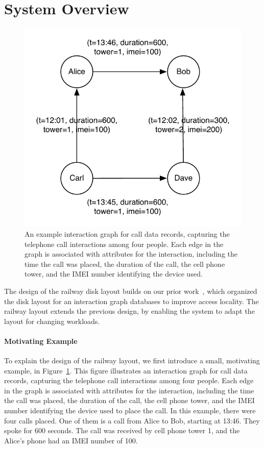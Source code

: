 \section{System Overview}\label{sec:system}


\begin{figure}[t]
\includegraphics[width=0.9\columnwidth]{figures/example_interaction.pdf} 
 \caption{An example interaction graph for call data records, capturing the
   telephone call interactions among four people. Each edge in the graph is
   associated with attributes for the interaction, including the time the call
   was placed, the duration of the call, the cell phone tower, and the IMEI
   number identifying the device used.}
 \label{fig:example}
 \end{figure}

The design of the railway disk layout builds on our prior work~\cite{gedik14}, 
which organized the disk layout for an interaction graph databases to improve
access locality. The railway layout extends the previous design, by enabling the
system to adapt the layout for changing workloads.

\paragraph*{Motivating Example}
%
To explain the design of the railway layout, we first introduce a small,
motivating example, in Figure~\ref{fig:example}. This figure illustrates an
interaction graph for call data records, capturing the telephone call
interactions among four people. Each edge in the graph is associated with
attributes for the interaction, including the time the call was placed, the
duration of the call, the cell phone tower, and the IMEI number identifying the
device used to place the call. In this example, there were four calls
placed. One of them is a call from Alice to Bob, starting at 13:46. They spoke
for 600 seconds. The call was received by cell phone tower 1, and the Alice's
phone had an IMEI number of 100.


